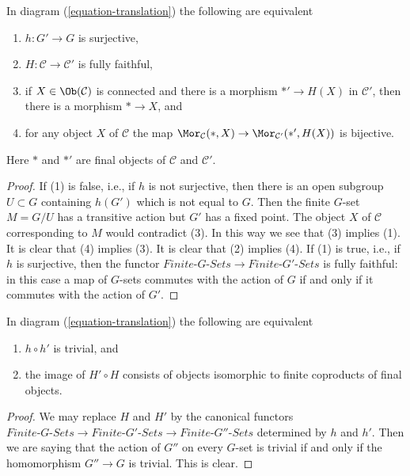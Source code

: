 \begin{lemma}
\label{lemma-functoriality-galois-surjective}
In diagram (\ref{equation-translation}) the following are equivalent
\begin{enumerate}
\item $h : G' \to G$ is surjective,
\item $H : \mathcal{C} \to \mathcal{C}'$ is fully faithful,
\item if $X \in \Ob(\mathcal{C})$ is connected and there is
a morphism $*' \to H(X)$ in $\mathcal{C}'$, then
there is a morphism $* \to X$, and
\item for any object $X$ of $\mathcal{C}$ the map
$\Mor_\mathcal{C}(*, X) \to \Mor_{\mathcal{C}'}(*', H(X))$
is bijective.
\end{enumerate}
Here $*$ and $*'$ are final objects of $\mathcal{C}$ and $\mathcal{C}'$.
\end{lemma}

\begin{proof}
If (1) is false, i.e., if $h$ is not surjective, then there is
an open subgroup $U \subset G$ containing $h(G')$ which is not
equal to $G$. Then the finite $G$-set $M = G/U$ has a transitive
action but $G'$ has a fixed point. The object $X$ of $\mathcal{C}$
corresponding to $M$ would contradict (3). In this way we see that
(3) implies (1). It is clear that (4) implies (3).
It is clear that (2) implies (4). If (1) is true, i.e., if
$h$ is surjective, then the functor
$\textit{Finite-}G\textit{-Sets} \to \textit{Finite-}G'\textit{-Sets}$
is fully faithful: in this case a map of $G$-sets commutes with the
action of $G$ if and only if it commutes with the action of $G'$.
\end{proof}

\begin{lemma}
\label{lemma-composition-trivial}
In diagram (\ref{equation-translation}) the following are equivalent
\begin{enumerate}
\item $h \circ h'$ is trivial, and
\item the image of $H' \circ H$ consists of objects isomorphic to finite
coproducts of final objects.
\end{enumerate}
\end{lemma}

\begin{proof}
We may replace $H$ and $H'$ by the canonical functors
$\textit{Finite-}G\textit{-Sets} \to \textit{Finite-}G'\textit{-Sets}
\to \textit{Finite-}G''\textit{-Sets}$ determined by $h$ and $h'$.
Then we are saying that the action of $G''$ on every $G$-set is trivial
if and only if the homomorphism $G'' \to G$ is trivial. This is clear.
\end{proof}

